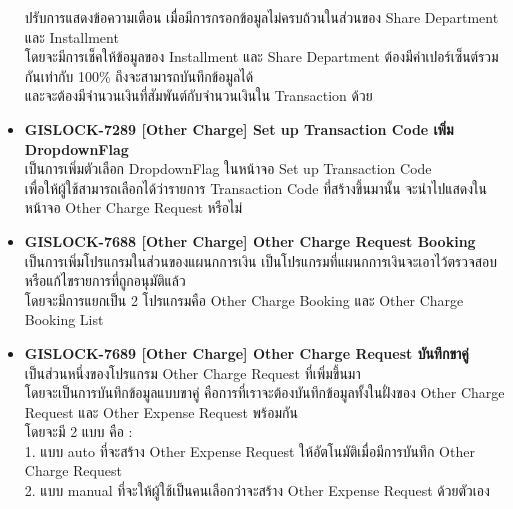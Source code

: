 \begin{itemize}
          ปรับการแสดงข้อความเตือน เมื่อมีการกรอกข้อมูลไม่ครบถ้วนในส่วนของ Share Department และ Installment \\
          โดยจะมีการเช็คให้ข้อมูลของ Installment และ Share Department ต้องมีค่าเปอร์เซ็นต์รวมกันเท่ากับ 100\% ถึงจะสามารถบันทึกข้อมูลได้ \\
          และจะต้องมีจำนวนเงินที่สัมพันต์กับจำนวนเงินใน Transaction ด้วย
    \item \textbf{{GISLOCK-7289 [Other Charge] Set up Transaction Code เพิ่ม DropdownFlag}} \\
          เป็นการเพิ่มตัวเลือก DropdownFlag ในหน้าจอ Set up Transaction Code \\
          เพื่อให้ผู้ใช้สามารถเลือกได้ว่ารายการ Transaction Code ที่สร้างขึ้นมานั้น จะนำไปแสดงในหน้าจอ Other Charge Request หรือไม่
    \item \textbf{{GISLOCK-7688 [Other Charge] Other Charge Request Booking}} \\
          เป็นการเพิ่มโปรแกรมในส่วนของแผนกการเงิน เป็นโปรแกรมที่แผนกการเงินจะเอาไว้ตรวจสอบหรือแก้ไขรายการที่ถูกอนุมัติแล้ว \\
          โดยจะมีการแยกเป็น 2 โปรแกรมคือ Other Charge Booking และ Other Charge Booking List
    \item \textbf{{GISLOCK-7689 [Other Charge] Other Charge Request บันทึกขาคู่}} \\
          เป็นส่วนหนึ่งของโปรแกรม Other Charge Request ที่เพิ่มขึ้นมา \\
          โดยจะเป็นการบันทึกข้อมูลแบบขาคู่ คือการที่เราจะต้องบันทึกข้อมูลทั้งในฝั่งของ Other Charge Request และ Other Expense Request พร้อมกัน \\
          โดยจะมี 2 แบบ คือ : \\
            1. แบบ auto ที่จะสร้าง Other Expense Request ให้อัตโนมัติเมื่อมีการบันทึก Other Charge Request \\
            2. แบบ manual ที่จะให้ผู้ใช้เป็นคนเลือกว่าจะสร้าง Other Expense Request ด้วยตัวเอง
\end{itemize}

